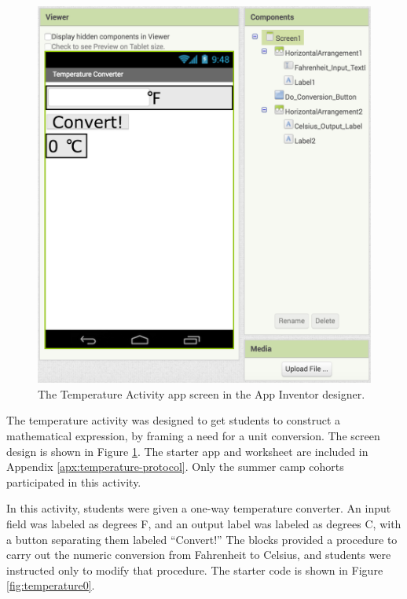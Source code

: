 \begin{figure}
  \centering
      \includegraphics[width=\textwidth]{images/temperatureActivity/temperature-designer}
  \caption[Temperature Activity App Designer View]{The Temperature Activity app screen in the App Inventor designer.}
  \label{fig:temperature-screen}
\end{figure}

The temperature activity was designed to get students to construct a mathematical expression, by framing a need for a unit conversion. The screen design is shown in Figure \ref{fig:temperature-screen}. The starter app and worksheet are included in Appendix \ref{apx:temperature-protocol}. Only the summer camp cohorts participated in this activity. 

In this activity, students were given a one-way temperature converter. An input field was labeled as degrees F, and an output label was labeled as degrees C, with a button separating them labeled ``Convert!'' The blocks provided a procedure to carry out the numeric conversion from Fahrenheit to Celsius, and students were instructed only to modify that procedure. The starter code is shown in Figure \ref{fig:temperature0}.

